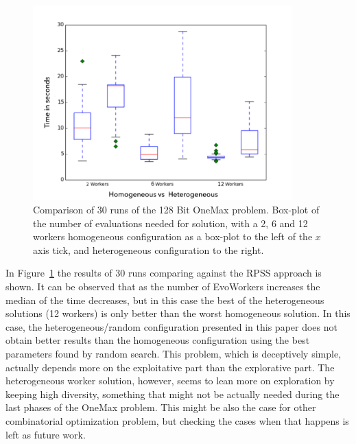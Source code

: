 \documentclass[graybox]{svmult}
\begin{document}
\begin{figure}[h!t]
    \centering
        \includegraphics[width=10cm]{img/one_max_comp.png}
    \caption{Comparison of 30 runs of the 128 Bit OneMax problem.
    Box-plot of the number of evaluations needed for solution, with a 2, 6 and 12 workers
    homogeneous configuration as a box-plot to the left of the $x$ axis
    tick, and heterogeneous configuration to the right.
    }
    \label{fig:comp-onemax}
  \end{figure}
In Figure~\ref{fig:comp-onemax} the results of 30 runs comparing against the RPSS approach is shown.
It can be observed that as the number of EvoWorkers increases the median of the time decreases, but
in this case the best of the heterogeneous solutions (12 workers) is only better than the worst homogeneous
solution. In this case, the heterogeneous/random configuration
presented in this paper does not obtain better results than the
homogeneous configuration using the best parameters found by random
search. This problem, which is deceptively simple, actually depends
more on the exploitative part than the explorative part. The
heterogeneous worker solution, however, seems to lean more on
exploration by keeping high diversity, something that might not be
actually needed during the last phases of the OneMax problem. This
might be also the case for other combinatorial optimization problem,
but checking the cases when that happens is left as future work.
\end{document}
